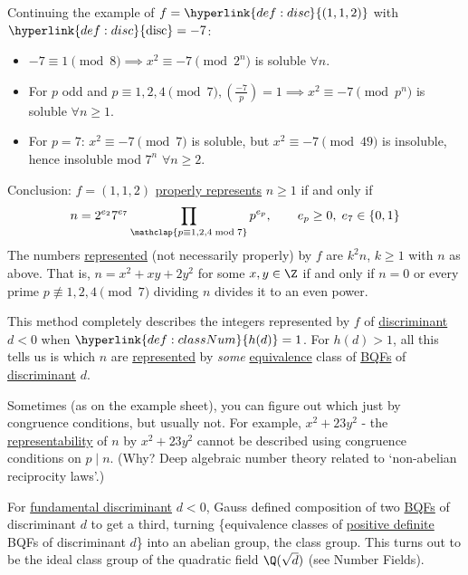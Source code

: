 \documentclass{article}
\newcommand{\legendre}[2]{\genfrac{(}{)}{}{}{#1}{#2}}
\DeclareMathOperator{\disc}{disc}
\begin{document}
\begin{eg}
    Continuing the example of $f = \hyperlink{def:disc}{(1, 1, 2)}$ with $\hyperlink{def:disc}{\disc} = -7$:
    \begin{itemize}
        \item $-7 \equiv 1 \pmod{8} \implies x^2 \equiv -7 \pmod{2^n}$ is soluble $\forall n$.
        \item For $p$ odd and $ p \equiv 1, 2, 4 \pmod{7}, \legendre{-7}{p} = 1 \implies x^2 \equiv -7 \pmod{p^n}$ is soluble $\forall n \geq 1$.
        \item For $p = 7$: $x^2 \equiv -7 \pmod{7}$ is soluble, but $x^2 \equiv -7 \pmod{49}$ is insoluble, hence insoluble mod $7^n$ $\forall n \geq 2$.
    \end{itemize}

    Conclusion: $f = (1, 1, 2)$ \hyperlink{def:propRep}{properly represents} $n \geq 1$ if and only if
    \begin{equation*}
        n = 2^{e_2} 7^{e_7} \prod_{\mathclap{p \equiv 1, 2, 4 \bmod{7}}} p^{e_p}, \qquad e_p \geq 0, \; e_7 \in \{0, 1\}
    \end{equation*}
    The numbers \hyperlink{def:rep}{represented} (not necessarily properly) by $f$ are $k^2 n$, $k \geq 1$ with $n$ as above.
    That is, $n = x^2 + x y + 2y^2$ for some $x, y \in \Z$ if and only if $n = 0$ or every prime $p \not\equiv 1, 2, 4 \pmod{7}$ dividing $n$ divides it to an even power.
\end{eg}

This method completely describes the integers represented by $f$ of \hyperlink{def:disc}{discriminant} $d < 0$ when $\hyperlink{def:classNum}{h(d)} = 1$.
For $h(d) > 1$, all this tells us is which $n$ are \hyperlink{def:rep}{represented} by \emph{some} \hyperlink{def:uniSub}{equivalence} class of \hyperlink{def:bqf}{BQFs} of \hyperlink{def:disc}{discriminant} $d$.

Sometimes (as on the example sheet), you can figure out which just by congruence conditions, but usually not.
For example, $x^2 + 23 y^2$ - the \hyperlink{def:rep}{representability} of $n$ by $x^2 + 23 y^2$ cannot be described using congruence conditions on $p \mid n$.
(Why? Deep algebraic number theory related to `non-abelian reciprocity laws'.)

For \hyperlink{def:fundDisc}{fundamental discriminant} $d < 0$, Gauss defined composition of two \hyperlink{def:bqf}{BQFs} of discriminant $d$ to get a third, turning \{equivalence classes of \hyperlink{def:definite}{positive definite} BQFs of discriminant $d$\} into an abelian group, the class group.
This turns out to be the ideal class group of the quadratic field $\Q(\sqrt{d})$ (see Number Fields).
\end{document}
